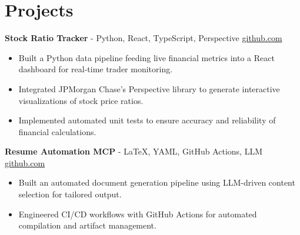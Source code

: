\documentclass[11pt]{article}
\begin{document}
\vspace{-18.5pt}

\section*{Projects}

\textbf{Stock Ratio Tracker}{ - Python, React, TypeScript, Perspective} \hfill \href{https://github.com/Monica20030707/Trading-Dashboard_UI}{github.com} \\
\vspace{-9pt}
\begin{itemize}
  \item Built a Python data pipeline feeding live financial metrics into a React dashboard for real-time trader monitoring.
  \item Integrated JPMorgan Chase's Perspective library to generate interactive visualizations of stock price ratios.
  \item Implemented automated unit tests to ensure accuracy and reliability of financial calculations.
\end{itemize}

\textbf{Resume Automation MCP}{ - LaTeX, YAML, GitHub Actions, LLM} \hfill \href{https://github.com/Monica20030707/Tex_OrangeLeaf-mcp}{github.com} \\
\vspace{-9pt}
\begin{itemize}
  \item Built an automated document generation pipeline using LLM-driven content selection for tailored output.
  \item Engineered CI/CD workflows with GitHub Actions for automated compilation and artifact management.
\end{itemize}

\end{document}
